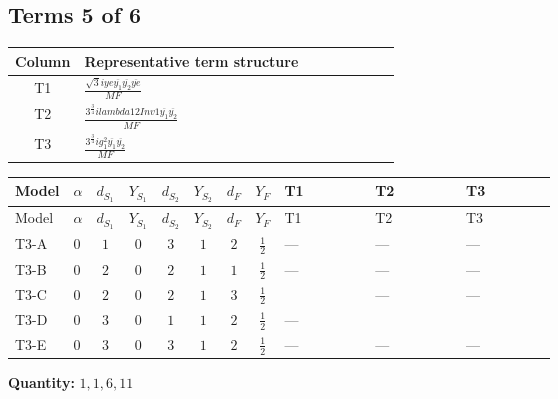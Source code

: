 \documentclass[8pt]{article}
\begin{document}
\begin{landscape}
\subsection*{Terms 5 of 6}
\begin{center}
\begin{tabular}{@{}c >{\raggedright\arraybackslash}p{0.82\linewidth}@{}}
\toprule
Column & Representative term structure \\
\midrule
T1 & \(\displaystyle \frac{\sqrt{3} i ye \overline{y_{1}} \overline{y_{2}} \overline{ye}}{MF}\) \\
\midrule
T2 & \(\displaystyle \frac{3^{\frac{3}{4}} i lambda12Inv1 \overline{y_{1}} \overline{y_{2}}}{MF}\) \\
\midrule
T3 & \(\displaystyle \frac{3^{\frac{3}{4}} i g_{1}^{2} \overline{y_{1}} \overline{y_{2}}}{MF}\) \\
\midrule
\bottomrule
\end{tabular}
\end{center}
\smallskip
\tiny
\begin{longtable}{@{}llcccccc >{\raggedright\arraybackslash}p{0.21\linewidth} >{\raggedright\arraybackslash}p{0.21\linewidth} >{\raggedright\arraybackslash}p{0.21\linewidth}@{}}
\toprule
Model & $\alpha$ & $d_{S_1}$ & $Y_{S_1}$ & $d_{S_2}$ & $Y_{S_2}$ & $d_F$ & $Y_F$ & T1 & T2 & T3 \\
\midrule
\endfirsthead
\toprule
Model & $\alpha$ & $d_{S_1}$ & $Y_{S_1}$ & $d_{S_2}$ & $Y_{S_2}$ & $d_F$ & $Y_F$ & T1 & T2 & T3 \\
\midrule
\endhead
T3-A & $0$ & $1$ & $0$ & $3$ & $1$ & $2$ & $\frac{1}{2}$ & --- & --- & --- \\
\midrule
T3-B & $0$ & $2$ & $0$ & $2$ & $1$ & $1$ & $\frac{1}{2}$ & --- & --- & --- \\
\midrule
T3-C & $0$ & $2$ & $0$ & $2$ & $1$ & $3$ & $\frac{1}{2}$ & \scriptsize\adjustbox{max width=\linewidth}{$\begin{gathered} \frac{\sqrt{3} i ye \overline{y_{1}} \overline{y_{2}} \overline{ye}}{12 MF}\end{gathered}$} & --- & --- \\
\midrule
T3-D & $0$ & $3$ & $0$ & $1$ & $1$ & $2$ & $\frac{1}{2}$ & --- & \scriptsize\adjustbox{max width=\linewidth}{$\begin{gathered} \frac{3^{\frac{3}{4}} i lambda12Inv1 \overline{y_{1}} \overline{y_{2}}}{6 MF}\end{gathered}$} & \scriptsize\adjustbox{max width=\linewidth}{$\begin{gathered} \frac{3^{\frac{3}{4}} i g_{1}^{2} \overline{y_{1}} \overline{y_{2}}}{8 MF}\end{gathered}$} \\
\midrule
T3-E & $0$ & $3$ & $0$ & $3$ & $1$ & $2$ & $\frac{1}{2}$ & --- & --- & --- \\
\midrule
\bottomrule
\end{longtable}
\clearpage
\noindent\textbf{Quantity: }$\mathrm{1,1,6,11}$\par\smallskip

\end{landscape}
\end{document}
